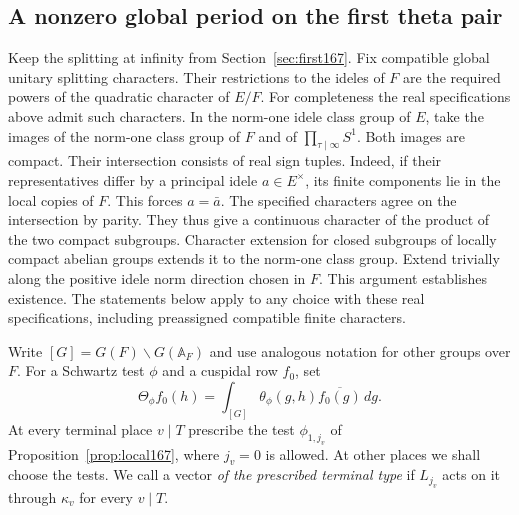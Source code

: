 \documentclass[a4paper,11pt]{article}
\theoremstyle{definition}
\theoremstyle{remark}
\numberwithin{equation}{section}
\begin{document}
\subsection{A nonzero global period on the first theta pair}\label{nav:VIII-01}
\label{sec:global167}

Keep the splitting at infinity from Section~\ref{sec:first167}.
Fix compatible global unitary splitting characters. Their
restrictions to the ideles of \(F\) are the required powers
of the quadratic character of \(E/F\). For completeness the
real specifications above admit such characters. In the
norm-one idele class group of \(E\), take the images of the
norm-one class group of \(F\) and of \(\prod_{\tau\mid\infty}S^1\).
Both images are compact. Their intersection consists of real
sign tuples. Indeed, if their representatives differ by a
principal idele \(a\in E^\times\), its finite components lie
in the local copies of \(F\). This forces \(a=\bar a\).
The specified characters agree on the intersection by parity.
They thus give a continuous character of the product of the
two compact subgroups. Character extension for closed
subgroups of locally compact abelian groups extends it to the
norm-one class group. Extend trivially along the positive
idele norm direction chosen in \(F\). This argument establishes
existence. The statements below apply to any choice with these
real specifications, including preassigned compatible finite
characters.

Write \([G]=G(F)\backslash G(\mathbb A_F)\) and use analogous
notation for other groups over \(F\). For a Schwartz test
\(\phi\) and a cuspidal row \(f_0\), set
\[
 \Theta_\phi f_0(h)=\int_{[G]}\theta_\phi(g,h)
                                \overline{f_0(g)}\,dg .
\]
At every terminal place \(v\mid T\) prescribe the test
\(\phi_{1,j_v}\) of Proposition~\ref{prop:local167}, where
\(j_v=0\) is allowed. At other places we shall choose the
tests. We call a vector \emph{of the prescribed terminal
type} if \(L_{j_v}\) acts on it through \(\kappa_v\) for every
\(v\mid T\).
\end{document}
